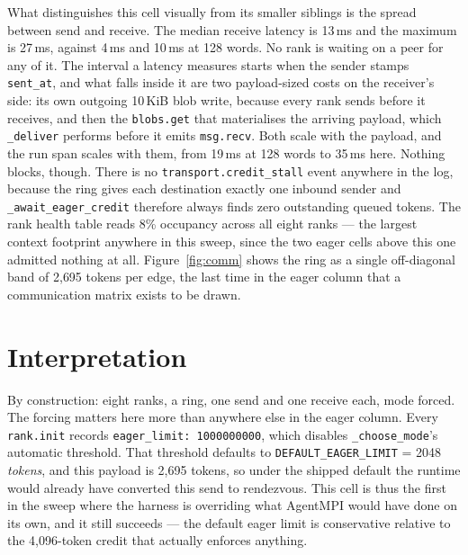 \documentclass[11pt]{article}
\begin{document}
What distinguishes this cell visually from its smaller siblings is the spread between
send and receive. The median receive latency is 13\,ms and the maximum is 27\,ms,
against 4\,ms and 10\,ms at 128 words. No rank is waiting on a peer for any of it.
The interval a latency measures starts when the sender stamps \texttt{sent\_at}, and
what falls inside it are two payload-sized costs on the receiver's side: its own
outgoing 10\,KiB blob write, because every rank sends before it receives, and then
the \texttt{blobs.get} that materialises the arriving payload, which
\texttt{\_deliver} performs before it emits \texttt{msg.recv}. Both scale with the
payload, and the run span scales with them, from 19\,ms at 128 words to 35\,ms here.
Nothing blocks, though. There is no
\texttt{transport.credit\_stall} event anywhere in the log, because the ring gives
each destination exactly one inbound sender and \texttt{\_await\_eager\_credit}
therefore always finds zero outstanding queued tokens. The rank health table reads 8\%
occupancy across all eight ranks --- the largest context footprint anywhere in this
sweep, since the two eager cells above this one admitted nothing at all.
Figure~\ref{fig:comm} shows the ring as a single off-diagonal band of 2{,}695 tokens
per edge, the last time in the eager column that a communication matrix exists to be
drawn.

\section{Interpretation}

By construction: eight ranks, a ring, one send and one receive each, mode forced. The
forcing matters here more than anywhere else in the eager column. Every
\texttt{rank.init} records \texttt{eager\_limit: 1000000000}, which disables
\texttt{\_choose\_mode}'s automatic threshold. That threshold defaults to
\texttt{DEFAULT\_EAGER\_LIMIT} = 2048 \emph{tokens}, and this payload is 2{,}695
tokens, so under the shipped default the runtime would already have converted this
send to rendezvous. This cell is thus the first in the sweep where the harness is
overriding what AgentMPI would have done on its own, and it still succeeds --- the
default eager limit is conservative relative to the 4{,}096-token credit that
actually enforces anything.
\end{document}
